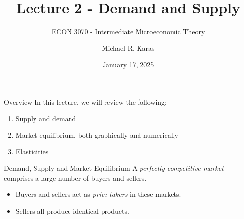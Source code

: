 \documentclass[12pt,t]{beamer}
\author{Michael R. Karas}
\title{Lecture 2 - Demand and Supply}
\subtitle{ECON 3070 - Intermediate Microeconomic Theory}
\date{January 17, 2025}
\begin{document}
\begin{frame}
  \titlepage
\end{frame}

\begin{frame}{Overview}
  In this lecture, we will review the following:
  \begin{enumerate}
    \item Supply and demand

    \item Market equilibrium, both graphically and numerically

    \item Elasticities
  \end{enumerate}
\end{frame}

\begin{frame}{Demand, Supply and Market Equilibrium}
  A \textit{perfectly competitive market} comprises a large number of buyers and sellers.
  \begin{itemize}
    \item Buyers and sellers act as \textit{price takers} in these markets.
    \item Sellers all produce identical products.
  \end{itemize}
\end{frame}
\end{document}
